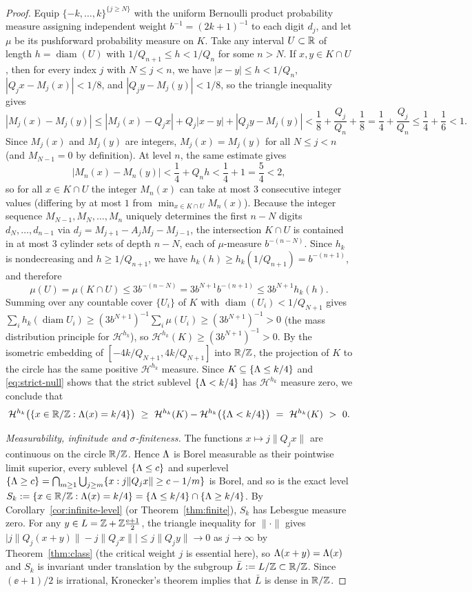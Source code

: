 \begin{proof}
Equip $\{-k,\dots,k\}^{\{j\ge N\}}$ with the uniform Bernoulli product
probability measure assigning independent weight $b^{-1}=(2k+1)^{-1}$ to each
digit $d_j$, and let $\mu$ be its pushforward probability measure on $K$. Take
any interval $U\subset\mathbb{R}$ of length $h=\operatorname{diam}(U)$ with
$1/Q_{n+1}\le h<1/Q_n$ for some $n>N$. If $x,y\in K\cap U$, then for every index
$j$ with $N\le j<n$, we have $|x-y|\le h<1/Q_n$, $|Q_jx-M_j(x)|<1/8$, and
$|Q_jy-M_j(y)|<1/8$, so the triangle inequality gives
\[
|M_j(x)-M_j(y)|
\le|M_j(x)-Q_jx|+Q_j|x-y|+|Q_jy-M_j(y)|
<\frac18+\frac{Q_j}{Q_n}+\frac18=\frac14+\frac{Q_j}{Q_n}\le\frac14+\frac16<1.
\]
Since $M_j(x)$ and $M_j(y)$ are integers, $M_j(x)=M_j(y)$ for all $N\le j<n$
(and $M_{N-1}=0$ by definition). At level $n$, the same estimate gives
\[
|M_n(x)-M_n(y)|<\frac14+Q_n h<\frac14+1=\frac54<2,
\]
so for all $x\in K\cap U$ the integer $M_n(x)$ can take at most $3$ consecutive
integer values (differing by at most $1$ from $\min_{x\in K\cap U}M_n(x)$).
Because the integer sequence $M_{N-1},M_N,\dots,M_n$ uniquely determines the
first $n-N$ digits $d_N,\dots,d_{n-1}$ via $d_j=M_{j+1}-A_jM_j-M_{j-1}$, the
intersection $K\cap U$ is contained in at most $3$ cylinder sets of depth $n-N$,
each of $\mu$-measure $b^{-(n-N)}$. Since $h_k$ is nondecreasing and
$h\ge1/Q_{n+1}$, we have $h_k(h)\ge h_k(1/Q_{n+1})=b^{-(n+1)}$, and therefore
\[
\mu(U)=\mu(K\cap U)\le 3b^{-(n-N)}=3b^{N+1}b^{-(n+1)}\le 3b^{N+1}h_k(h).
\]
Summing over any countable cover $\{U_i\}$ of $K$ with
$\operatorname{diam}(U_i)<1/Q_{N+1}$ gives
$\sum_i h_k(\operatorname{diam}U_i)\ge(3b^{N+1})^{-1}\sum_i\mu(U_i)\ge(3b^{N+1})^{-1}>0$
(the mass distribution principle for $\mathcal H^{h_k}$), so
$\mathcal H^{h_k}(K)\ge(3b^{N+1})^{-1}>0$. By the isometric embedding of
$[-4k/Q_{N+1},4k/Q_{N+1}]$ into $\mathbb{R}/\mathbb{Z}$, the projection of $K$ to the circle has
the same positive $\mathcal H^{h_k}$ measure. Since $K\subseteq\{\Lambda\le k/4\}$
and \eqref{eq:strict-null} shows that the strict sublevel $\{\Lambda<k/4\}$ has
$\mathcal H^{h_k}$ measure zero, we conclude that
\[
 \mathcal H^{h_k}\bigl(\{x\in\mathbb{R}/\mathbb{Z}:\Lambda(x)=k/4\}\bigr)
 \ \ge\ \mathcal H^{h_k}(K)-\mathcal H^{h_k}\bigl(\{\Lambda<k/4\}\bigr)
 \ =\ \mathcal H^{h_k}(K)\ >\ 0 .
\]

\emph{Measurability, infinitude and $\sigma$-finiteness.} The functions
$x\mapsto j\|Q_jx\|$ are continuous on the circle $\mathbb{R}/\mathbb{Z}$. Hence $\Lambda$ is Borel
measurable as their pointwise limit superior, every sublevel $\{\Lambda\le c\}$ and
superlevel $\{\Lambda\ge c\}=\bigcap_{m\ge1}\bigcup_{j\ge m}\{x:j\|Q_jx\|\ge c-1/m\}$
is Borel, and so is the exact level
$S_k:=\{x\in\mathbb{R}/\mathbb{Z}:\Lambda(x)=k/4\}=\{\Lambda\le k/4\}\cap\{\Lambda\ge k/4\}$. By
Corollary~\ref{cor:infinite-level} (or Theorem~\ref{thm:finite}), $S_k$ has
Lebesgue measure zero. For any $y\in L=\mathbb{Z}+\mathbb{Z}\frac{\mathrm{e}+1}{2}$, the triangle
inequality for $\|\cdot\|$ gives
$\bigl|j\|Q_j(x+y)\|-j\|Q_jx\|\bigr|\le j\|Q_jy\|\to0$ as $j\to\infty$ by
Theorem~\ref{thm:class} (the critical weight $j$ is essential here), so
$\Lambda(x+y)=\Lambda(x)$ and $S_k$ is invariant under translation by the subgroup
$\bar L:=L/\mathbb{Z}\subset\mathbb{R}/\mathbb{Z}$. Since $(\ee+1)/2$ is irrational, Kronecker's theorem
implies that $\bar L$ is dense in $\mathbb{R}/\mathbb{Z}$.


\end{proof}
